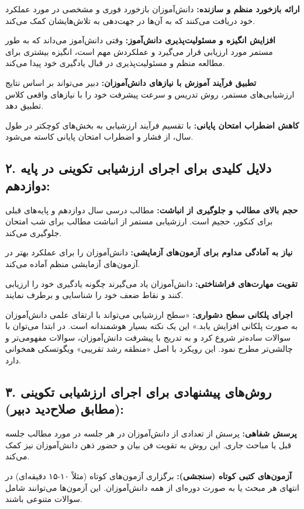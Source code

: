 \documentclass[a4paper]{article}
\begin{document}
\textbf{ارائه بازخورد منظم و سازنده:} دانش‌آموزان بازخورد فوری و مشخصی در مورد عملکرد خود دریافت می‌کنند که به آن‌ها در جهت‌دهی به تلاش‌هایشان کمک می‌کند.

\textbf{افزایش انگیزه و مسئولیت‌پذیری دانش‌آموز:} وقتی دانش‌آموز می‌داند که به طور مستمر مورد ارزیابی قرار می‌گیرد و عملکردش مهم است، انگیزه بیشتری برای مطالعه منظم و مسئولیت‌پذیری در قبال یادگیری خود پیدا می‌کند.

\textbf{تطبیق فرآیند آموزش با نیازهای دانش‌آموزان:} دبیر می‌تواند بر اساس نتایج ارزشیابی‌های مستمر، روش تدریس و سرعت پیشرفت خود را با نیازهای واقعی کلاس تطبیق دهد.

\textbf{کاهش اضطراب امتحان پایانی:} با تقسیم فرآیند ارزشیابی به بخش‌های کوچکتر در طول سال، از فشار و اضطراب امتحان پایانی کاسته می‌شود.
\medskip

\subsection*{۲. دلایل کلیدی برای اجرای ارزشیابی تکوینی در پایه دوازدهم:}
\textbf{حجم بالای مطالب و جلوگیری از انباشت:} مطالب درسی سال دوازدهم و پایه‌های قبلی برای کنکور، حجیم است. ارزشیابی مستمر از انباشت مطالب برای شب امتحان جلوگیری می‌کند.

\textbf{نیاز به آمادگی مداوم برای آزمون‌های آزمایشی:} دانش‌آموزان را برای عملکرد بهتر در آزمون‌های آزمایشی منظم آماده می‌کند.

\textbf{تقویت مهارت‌های فراشناختی:} دانش‌آموزان یاد می‌گیرند چگونه یادگیری خود را ارزیابی کنند و نقاط ضعف خود را شناسایی و برطرف نمایند.

\textbf{اجرای پلکانی سطح دشواری:}  «سطح ارزشیابی می‌تواند با ارتقای علمی دانش‌آموزان به صورت پلکانی افزایش یابد.» این یک نکته بسیار هوشمندانه است. در ابتدا می‌توان با سوالات ساده‌تر شروع کرد و به تدریج با پیشرفت دانش‌آموزان، سوالات مفهومی‌تر و چالشی‌تر مطرح نمود. این رویکرد با اصل «منطقه رشد تقریبی» ویگوتسکی همخوانی دارد.
\medskip

\subsection*{۳. روش‌های پیشنهادی برای اجرای ارزشیابی تکوینی (مطابق صلاح‌دید دبیر):}
\textbf{پرسش شفاهی:} پرسش از تعدادی از دانش‌آموزان در هر جلسه در مورد مطالب جلسه قبل یا مباحث جاری. این روش به تقویت فن بیان و حضور ذهن دانش‌آموزان نیز کمک می‌کند.

\textbf{آزمون‌های کتبی کوتاه (سنجشی):} برگزاری آزمون‌های کوتاه (مثلاً ۱۰-۱۵ دقیقه‌ای) در انتهای هر مبحث یا به صورت دوره‌ای از همه دانش‌آموزان. این آزمون‌ها می‌توانند شامل سوالات متنوعی باشند.
\end{document}
